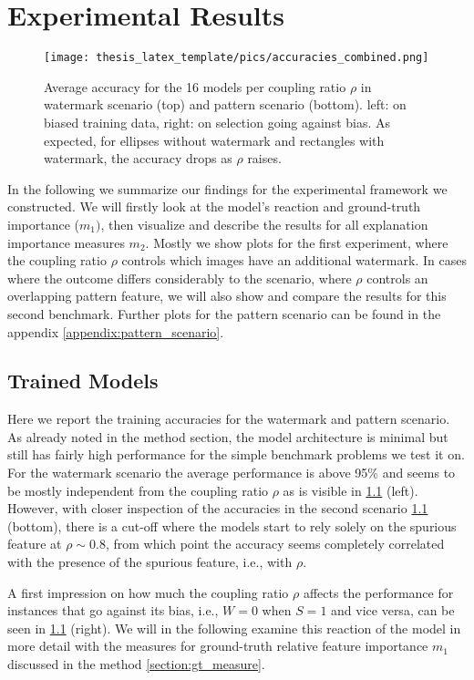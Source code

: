 \chapter{Experimental Results}\label{chapter:results}

\begin{figure}[ht!]
    \centering
    \texttt{[image: thesis\_latex\_template/pics/accuracies\_combined.png]}
    \caption[Accuracies]{Average accuracy for the 16 models per coupling ratio $\rho$ in watermark scenario (top) and pattern scenario (bottom). left: on biased training data, right: on selection going against bias. As expected, for ellipses without watermark and rectangles with watermark, the accuracy drops as $\rho$ raises.}
    \label{fig:accuracy}
\end{figure}

In the following we summarize our findings for the experimental framework we constructed. We will firstly look at the model's reaction and ground-truth importance ($m_1)$, then visualize and describe the results for all explanation importance measures $m_2$.
Mostly we show plots for the first experiment, where the coupling ratio $\rho$ controls which images have an additional watermark. In cases where the outcome differs considerably to the scenario, where $\rho$ controls an overlapping pattern feature, we will also show and compare the results for this second benchmark. Further plots for the pattern scenario can be found in the appendix \cref{appendix:pattern_scenario}.

\section{Trained Models}
Here we report the training accuracies for the watermark and pattern scenario. 
As already noted in the method section, the model architecture is minimal but still has fairly high performance for the simple benchmark problems we test it on. 
For the watermark scenario the average performance is above 95\% and seems to be mostly independent from the coupling ratio $\rho$ as is visible in \cref{fig:accuracy} (left).
However, with closer inspection of the accuracies in the second scenario \cref{fig:accuracy} (bottom), there is a cut-off where the models start to rely solely on the spurious feature at $\rho \sim 0.8$, from which point the accuracy seems completely correlated with the presence of the spurious feature, i.e., with $\rho$.

A first impression on how much the coupling ratio $\rho$ affects the performance for instances that go against its bias, i.e., $W=0$ when $S=1$ and vice versa, can be seen in \cref{fig:accuracy} (right). We will in the following examine this reaction of the model in more detail with the measures for ground-truth relative feature importance $m_1$ discussed in the method \cref{section:gt_measure}. 

